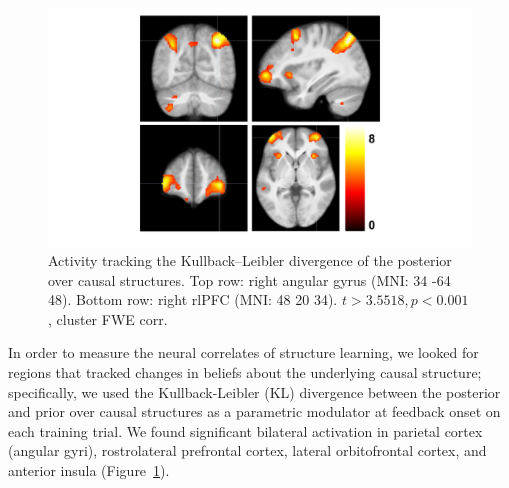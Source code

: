 \documentclass[10pt,letterpaper]{article}
\begin{document}
\begin{figure}[ht]
\begin{center}
\includegraphics[scale=0.5,  trim = 130 50 0 0]{kl-divergence.pdf}
\end{center}
\caption{Activity tracking the Kullback--Leibler divergence of the posterior over causal structures. Top row: right angular gyrus (MNI: 34 -64 48). Bottom row: right rlPFC (MNI: 48 20 34). $t > 3.5518, p < 0.001$, cluster FWE corr.} 
\label{kl-divergence-img}
\end{figure}


In order to measure the neural correlates of structure learning, we looked for regions that tracked changes in beliefs about the underlying causal structure; specifically, we used the Kullback-Leibler (KL) divergence between the posterior and prior over causal structures as a parametric modulator at feedback onset on each training trial. We found significant bilateral activation in parietal cortex (angular gyri), rostrolateral prefrontal cortex, lateral orbitofrontal cortex, and anterior insula (Figure~\ref{kl-divergence-img}).

\end{document}
